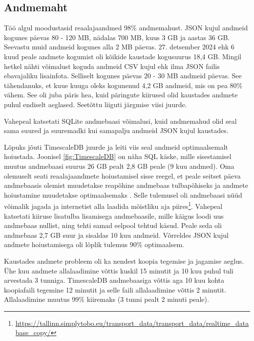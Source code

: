 \subsection{Andmemaht}

Töö algul moodustasid reaalajaandmed 98\% andmemahust. JSON kujul andmeid kogunes päevas 80 - 120 MB, nädalas 700 MB, kuus 3 GB ja aastas 36 GB. Seevastu muid andmeid kogunes alla 2 MB päevas. 27. detsember 2024 ehk 6 kuud peale andmete kogumist oli kõikide kaustade kogusuurus 18,4 GB. Mingil hetkel nähti võimalust koguda andmeid CSV kujul ehk ilma JSON failis ebavajaliku lisainfota. Selliselt kogunes päevas 20 - 30 MB andmeid päevas. See tähendanuks, et kuue kuuga oleks kogunenud 4,2 GB andmeid, mis on pea 80\% vähem. See oli juba päris hea, kuid päringute kiirused olid kaustades andmete puhul endiselt aeglased. Seetõttu liiguti järgmise viisi juurde.

Vahepeal katsetati SQLite andmebaasi võimalusi, kuid andmemahud olid seal sama suured ja suuremadki kui samapalju andmeid JSON kujul kaustades. 

Lõpuks jõuti TimescaleDB juurde ja leiti viis seal andmeid optimaalsemalt hoiustada. Joonisel \ref{fig:TimescaleDB} on näha SQL käske, mille sisestamisel muutus andmebaasi suurus 26 GB pealt 2,8 GB peale (9 kuu andmed). Oma olemuselt seati reaalajaandmete hoiustamisel sisse reegel, et peale seitset päeva andmebaasis olemist muudetakse reapõhine andmebaas tulbapõhiseks ja andmete hoiustamine muudetakse optimaalsemaks \cite{timescale_hypercore}. Selle tulemusel oli andmebaasi nüüd võimalik jagada ja internetist alla laadida mõistliku aja piires\footnote{\url{https://tallinn.simplytobo.eu/transport_data/transport_data/realtime_database_copy/}}. Vahepeal katsetati kiiruse lisatulba lisamisega andmebaasile, mille käigus loodi uus andmebaas nullist, ning tehti samad eelpool tehtud käsud. Peale seda oli andmebaas 2,7 GB suur ja sisaldas 10 kuu andmeid. Võrreldes JSON kujul andmete hoiustamisega oli lõplik tulemus 90\% optimaalsem.

Kaustades andmete probleem oli ka nendest koopia tegemise ja jagamise aeglus. Ühe kuu andmete allalaadimine võttis kuskil 15 minutit ja 10 kuu puhul tuli arvestada 3 tunniga. TimescaleDB andmebaasiga  võttis aga 10 kuu kohta koopiafaili tegemine 12 minutit ja selle faili allalaadimine võttis 2 minutit. Allalaadimine muutus 99\% kiiremaks (3 tunni pealt 2 minuti peale).

